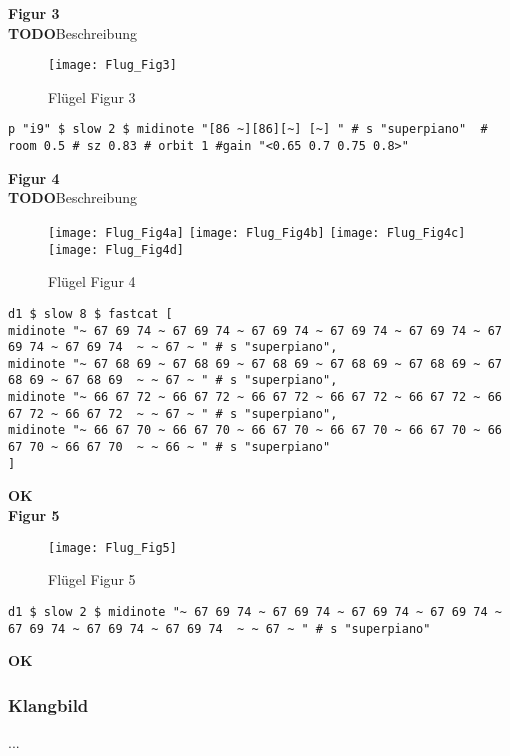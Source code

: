 \documentclass[
10pt, %
a4paper, %
oneside, %
headinclude,footinclude, %
BCOR5mm, %
]{scrartcl}
\begin{document}
\noindent \textbf{Figur 3}\\
{\color{red}\textbf{TODO}}Beschreibung\\
\begin{figure}[h]
	\centering 
	\texttt{[image: Flug\_Fig3]} 
	\caption{Flügel Figur 3}
\end{figure}
\begin{lstlisting}
p "i9" $ slow 2 $ midinote "[86 ~][86][~] [~] " # s "superpiano"  # room 0.5 # sz 0.83 # orbit 1 #gain "<0.65 0.7 0.75 0.8>"
\end{lstlisting}


\noindent \textbf{Figur 4}\\
{\color{red}\textbf{TODO}}Beschreibung\\
\begin{figure}[h]
	\centering 
	\texttt{[image: Flug\_Fig4a]} 
	\texttt{[image: Flug\_Fig4b]} 
	\texttt{[image: Flug\_Fig4c]} 
	\texttt{[image: Flug\_Fig4d]} 
	\caption{Flügel Figur 4}
\end{figure}
\begin{lstlisting}
d1 $ slow 8 $ fastcat [
midinote "~ 67 69 74 ~ 67 69 74 ~ 67 69 74 ~ 67 69 74 ~ 67 69 74 ~ 67 69 74 ~ 67 69 74  ~ ~ 67 ~ " # s "superpiano",
midinote "~ 67 68 69 ~ 67 68 69 ~ 67 68 69 ~ 67 68 69 ~ 67 68 69 ~ 67 68 69 ~ 67 68 69  ~ ~ 67 ~ " # s "superpiano",
midinote "~ 66 67 72 ~ 66 67 72 ~ 66 67 72 ~ 66 67 72 ~ 66 67 72 ~ 66 67 72 ~ 66 67 72  ~ ~ 67 ~ " # s "superpiano",
midinote "~ 66 67 70 ~ 66 67 70 ~ 66 67 70 ~ 66 67 70 ~ 66 67 70 ~ 66 67 70 ~ 66 67 70  ~ ~ 66 ~ " # s "superpiano"
]
\end{lstlisting}
{\color{green}\textbf{OK}} \\


\noindent \textbf{Figur 5}\\
\begin{figure}[h]
	\centering 
	\texttt{[image: Flug\_Fig5]} 
	\caption{Flügel Figur 5}
\end{figure}
\begin{lstlisting}
d1 $ slow 2 $ midinote "~ 67 69 74 ~ 67 69 74 ~ 67 69 74 ~ 67 69 74 ~ 67 69 74 ~ 67 69 74 ~ 67 69 74  ~ ~ 67 ~ " # s "superpiano"
\end{lstlisting}
{\color{green}\textbf{OK}} \\

\subsubsection{Klangbild}
...
\end{document}
